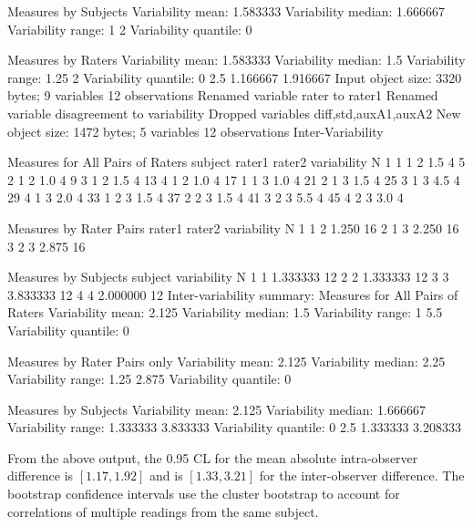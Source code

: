 \begin{Schunk}
\begin{Soutput}
Measures by Subjects
Variability mean:  1.583333 
Variability median:  1.666667 
Variability range:  1 2 
Variability quantile: 
0%:  1   25%:  1.5   50%:  1.666667   75%:  1.75   100%:  2 

Measures by Raters
Variability mean:  1.583333 
Variability median:  1.5 
Variability range:  1.25 2 
Variability quantile: 
0%:  1.25   25%:  1.375   50%:  1.5   75%:  1.75   100%:  2 
    2.5%    97.5% 
1.166667 1.916667 
Input object size:	 3320 bytes;	 9 variables	 12 observations
Renamed variable	 rater 	to rater1 
Renamed variable	 disagreement 	to variability 
Dropped variables	diff,std,auxA1,auxA2
New object size:	1472 bytes;	5 variables	12 observations
Inter-Variability 

Measures for All Pairs of Raters
   subject rater1 rater2 variability N
1        1      1      2         1.5 4
5        2      1      2         1.0 4
9        3      1      2         1.5 4
13       4      1      2         1.0 4
17       1      1      3         1.0 4
21       2      1      3         1.5 4
25       3      1      3         4.5 4
29       4      1      3         2.0 4
33       1      2      3         1.5 4
37       2      2      3         1.5 4
41       3      2      3         5.5 4
45       4      2      3         3.0 4

Measures by Rater Pairs
  rater1 rater2 variability  N
1      1      2       1.250 16
2      1      3       2.250 16
3      2      3       2.875 16

Measures by Subjects
  subject variability  N
1       1    1.333333 12
2       2    1.333333 12
3       3    3.833333 12
4       4    2.000000 12
Inter-variability summary:
Measures for All Pairs of Raters
Variability mean:  2.125 
Variability median:  1.5 
Variability range:  1 5.5 
Variability quantile: 
0%:  1   25%:  1.375   50%:  1.5   75%:  2.25   100%:  5.5 

Measures by Rater Pairs only
Variability mean:  2.125 
Variability median:  2.25 
Variability range:  1.25 2.875 
Variability quantile: 
0%:  1.25   25%:  1.75   50%:  2.25   75%:  2.5625   100%:  2.875 

Measures by Subjects
Variability mean:  2.125 
Variability median:  1.666667 
Variability range:  1.333333 3.833333 
Variability quantile: 
0%:  1.333333   25%:  1.333333   50%:  1.666667   75%:  2.458333   100%:  3.833333 
    2.5%    97.5% 
1.333333 3.208333 
\end{Soutput}
\end{Schunk}
From the above output, the 0.95 CL for the mean absolute
intra-observer difference is $[1.17, 1.92]$ and is $[1.33, 3.21]$ for the
inter-observer difference.  The bootstrap confidence intervals use the
cluster bootstrap to account for correlations of multiple readings
from the same subject.

